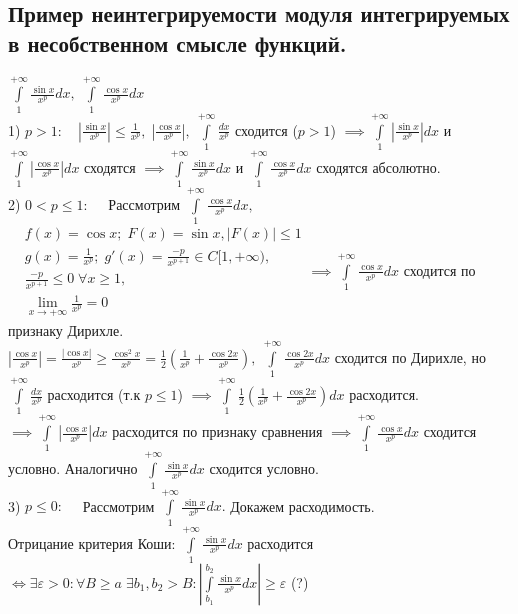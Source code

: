 \documentclass[../main.tex]{subfiles}
\begin{document}
\subsection{Пример неинтегрируемости модуля интегрируемых в несобственном смысле функций.}
$\int\limits_{1}^{+\infty}\frac{\sin{x}}{x^{p}}dx,\; \int\limits_{1}^{+\infty}\frac{\cos{x}}{x^{p}}dx  $
\\1) $p>1: \quad \left|\frac{\sin{x}}{x^{p}}\right|\leqslant \frac{1}{x^{p}}, \; \left| \frac{\cos{x}}{x^{p}}\right|, \; \int\limits_{1}^{+\infty}\frac{dx}{x^{p}} $ сходится ($p>1$) $\implies \int\limits_{1}^{+\infty}\left| \frac{\sin{x}}{x^{p}}\right| dx  $ и $\int\limits_{1}^{+\infty}\left| \frac{ \cos{x }}{x^{ p} }\right|dx$ сходятся $\implies \int\limits_{1}^{+\infty} \frac{\sin{x}}{x^{p}}dx  $ и $\int\limits_{1}^{+\infty}\frac{\cos{x}}{x^{p}} dx$ сходятся абсолютно. 
\\2) $0<p\leqslant 1: \quad $ Рассмотрим $\int\limits_{1}^{+\infty}\frac{\cos{x}}{x^{p}} dx,$ 
$
\begin{aligned}
&f(x)=\cos{x};\; F(x)=\sin{x}, |F(x)| \leqslant 1\\
&g(x)=\frac{1}{x^{p}}; \; g'(x)=\frac{-p}{x^{p+1}}\in C [1,+\infty),\\
&\frac{-p}{x^{p+1}} \leqslant 0 \; \forall x \geqslant 1,\\
&\lim\limits_{x\to +\infty}\frac{1}{x^{p}}=0
\end{aligned}
\implies \int\limits_{1}^{+\infty}\frac{\cos{x}}{x^{p}}dx $ сходится по признаку Дирихле.
\\ $\left| \frac{\cos{x}}{x^{p}}\right| = \frac{|\cos{x}|}{x^{p}}\geqslant \frac{\cos^{2}{x}}{x^{p}}=\frac{1}{2}\left(\frac{1}{x^{p}}+\frac{\cos{2x}}{x^{p}}\right), \; \int\limits_{1}^{+\infty}\frac{\cos{2x}}{x^{p}}dx$ сходится по Дирихле, но $\int\limits_{1}^{+\infty}\frac{dx}{x^{p}}$ расходится (т.к $p\leqslant 1$) $\implies \int\limits_{1}^{+\infty}\frac{1}{2}\left(\frac{1}{x^{p}}+\frac{\cos{2x}}{x^{p}}\right) dx  $ расходится. $\implies \int\limits_{1}^{+\infty}\left| \frac{\cos{x}}{x^{p}}\right| dx  $ расходится по признаку сравнения $\implies \int\limits_{ 1 }^{+\infty}\frac{\cos{x}}{x^{p}}dx  $ сходится условно. Аналогично $\int\limits_{1  }^{+\infty}\frac{\sin{x}}{x^{p}}dx $ сходится условно. 
\\3) $p\leqslant 0: \quad$ Рассмотрим $\int\limits_{1}^{+\infty}\frac{\sin{x}}{x^{p}}dx.$ Докажем расходимость. 
\\Отрицание критерия Коши: $\int\limits_{1}^{+\infty}\frac{\sin{x}}{x^{p}}dx $ расходится $\Leftrightarrow \exists \varepsilon> 0 : \forall B\geqslant a \; \exists b_{1},b_{2} > B : \left| \int\limits_{b_{1}}^{b_{2}} \frac{\sin{x}}{x^{p}}dx\right|\geqslant \varepsilon$ (?)
\end{document}
